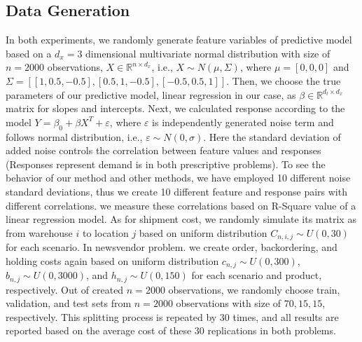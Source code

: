 \documentclass[12pt]{article}
\begin{document}
\subsection{Data Generation}
\label{subsec:DataGeneration}
In both experiments, we randomly generate feature variables of predictive model based on a $d_x=3$ dimensional multivariate normal distribution with size of $n=2000$ observations, $X \in \mathbb{R}^{n \times d_x}$, i.e., $X\sim N(\mu, \Sigma)$, where $\mu=[0,0,0]$ and $\Sigma=[[1,0.5,-0.5],[0.5,1,-0.5],[-0.5,0.5,1]]$. Then, we choose the true parameters of our predictive model, linear regression in our case, as $\beta \in \mathbb{R}^{d_l \times d_x}$ matrix for slopes and intercepts. Next, we calculated response according to the model $Y=\beta_0+\beta X^T+\varepsilon$, where $\varepsilon$ is independently generated noise term and follows normal distribution, i.e., $\varepsilon \sim N(0, \sigma)$. Here the standard deviation of added noise controls the correlation between feature values and responses (Responses represent demand is in both prescriptive problems). To see the behavior of our method and other methods, we have employed 10 different noise standard deviations, thus we create 10 different feature and response pairs with different correlations. we measure these correlations based on R-Square value of a linear regression model. As for shipment cost, we randomly simulate its matrix as from warehouse $i$ to location $j$ based on uniform distribution $C_{n,i,j} \sim U(0,30)$ for each scenario. In newsvendor problem. we create order, backordering, and holding costs again based on uniform distribution $c_{n,j} \sim U(0,300)$, $b_{n,j} \sim U(0,3000)$, and $h_{n,j} \sim U(0,150)$ for each scenario and product, respectively. Out of created $n=2000$ observations, we randomly choose train, validation, and test sets from $n=2000$ observations with size of $70, 15, 15$, respectively. This splitting process is repeated by $30$ times, and all results are reported based on the average cost of these $30$ replications in both problems.
\end{document}
